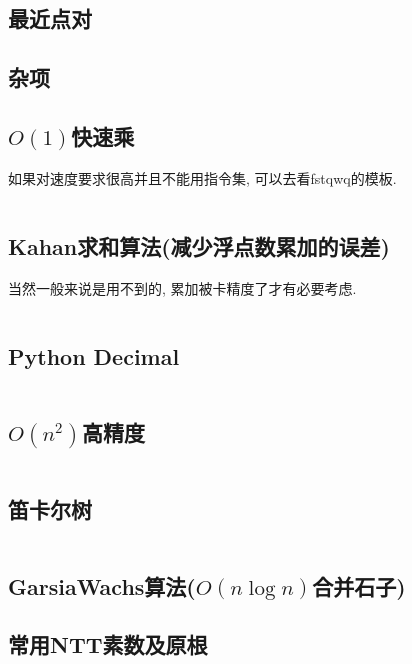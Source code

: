\documentclass[a4paper, twoside]{article}
\begin{document}
			\subsection{最近点对}
				

		\newpage
	
	\begin{multicols}{2}
		\section{杂项}
			\subsection{$O(1)$快速乘}
				如果对速度要求很高并且不能用指令集, 可以去看fstqwq的模板.

				\inputminted{cpp}{../src/misc/O(1)快速乘.cpp}
			
			\subsection{Kahan求和算法(减少浮点数累加的误差)}
				当然一般来说是用不到的, 累加被卡精度了才有必要考虑.
				\inputminted{cpp}{../src/misc/kahan.cpp}
			
			\subsection{Python Decimal}
				\inputminted{python}{../src/misc/decimal.py}
			
			\subsection{$O(n^2)$高精度}
				\inputminted{cpp}{../src/misc/高精度.cpp}
			
			\subsection{笛卡尔树}
				\inputminted{cpp}{../src/misc/笛卡尔树.cpp}
			
			\subsection{GarsiaWachs算法($O(n\log n)$合并石子)}
				
			
			\subsection{常用NTT素数及原根}
				


\end{multicols}
\end{document}
